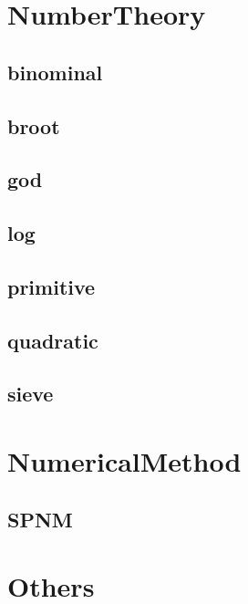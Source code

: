 \section{NumberTheory}
\subsection{binominal}
\raggedbottom
\hrulefill
\subsection{broot}
\raggedbottom
\hrulefill
\subsection{god}
\raggedbottom
\hrulefill
\subsection{log}
\raggedbottom
\hrulefill
\subsection{primitive}
\raggedbottom
\hrulefill
\subsection{quadratic}
\raggedbottom
\hrulefill
\subsection{sieve}
\raggedbottom
\hrulefill

\section{NumericalMethod}
\subsection{SPNM}
\raggedbottom
\hrulefill

\section{Others}
